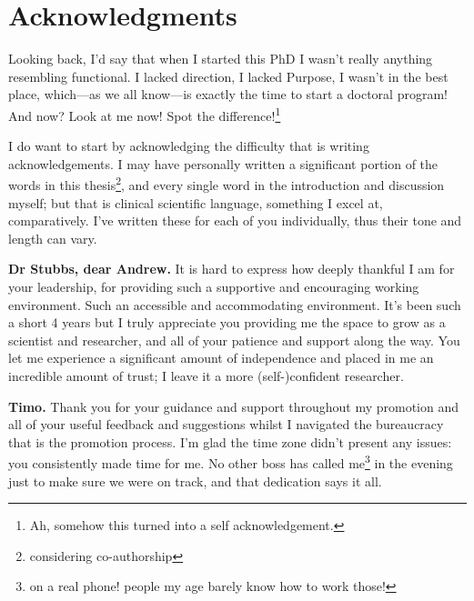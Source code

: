 \chapter{Acknowledgments}
\vspace{-1cm}

Looking back, I'd say that when I started this PhD I wasn't really anything resembling functional. I lacked direction, I lacked Purpose, I wasn't in the best place, which---as we all know---is exactly the time to start a doctoral program! And now? Look at me now! Spot the difference!\footnote{Ah, somehow this turned into a self acknowledgement.\protect\footnotemark}

I do want to start by acknowledging the difficulty that is writing acknowledgements. I may have personally written a significant portion of the words in this thesis\footnote{considering co-authorship}, and every single word in the introduction and discussion myself; but that is clinical scientific language, something I excel at, comparatively. I've written these for each of you individually, thus their tone and length can vary.


\textbf{Dr Stubbs, dear Andrew.} It is hard to express how deeply thankful I am for your leadership, for providing such a supportive and encouraging working environment. Such an accessible and accommodating environment. It's been such a short 4 years but I truly appreciate you providing me the space to grow as a scientist and researcher, and all of your patience and support along the way. You let me experience a significant amount of independence and placed in me an incredible amount of trust; I leave it a more (self-)confident researcher.

\textbf{Timo.} Thank you for your guidance and support throughout my promotion and all of your useful feedback and suggestions whilst I navigated the bureaucracy that is the promotion process. I'm glad the time zone didn't present any issues: you consistently made time for me. No other boss has called me\footnote{on a real phone! people my age barely know how to work those!} in the evening just to make sure we were on track, and that dedication says it all.

